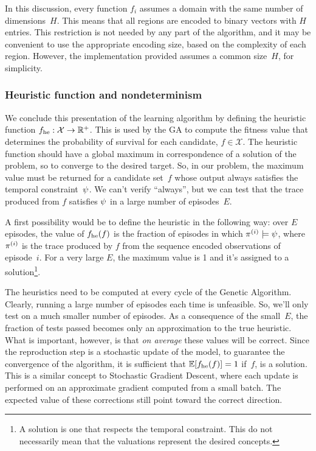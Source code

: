 In this discussion, every function $f_i$ assumes a domain with the same number
of dimensions~$H$. This means that all regions are encoded to binary vectors
with $H$ entries. This restriction is not needed by any part of the algorithm,
and it may be convenient to use the appropriate encoding size, based on the
complexity of each region. However, the implementation provided assumes a
common size~$H$, for simplicity.


\subsubsection{Heuristic function and nondeterminism}

We conclude this presentation of the learning algorithm by defining the
heuristic function $f_{\text{he}}: \mathcal{X} \to \mathbb{R}^+$. This is used by the
GA to compute the fitness value that determines the probability of survival
for each candidate, $f \in \mathcal{X}$. The heuristic function should have a
global maximum in correspondence of a solution of the problem, so to
converge to the desired target. So, in our problem, the maximum value must be
returned for a candidate set~$f$ whose output always satisfies the temporal
constraint~$\psi$. We can't verify ``always'', but we can test that
the trace produced from $f$ satisfies $\psi$ in a large number of
episodes~$E$.

A first possibility would be to define the heuristic in the following way:
over $E$ episodes, the value of $f_{\text{he}}(f)$ is the fraction of episodes
in which $\pi^{(i)} \models \psi$, where $\pi^{(i)}$ is
the trace produced by $f$ from the sequence encoded observations of
episode~$i$. For a very large $E$, the maximum value is 1 and it's assigned to
a solution\footnote{A solution is one that respects the temporal constraint.
This do not necessarily mean that the valuations represent the desired
concepts.}.

The heuristics need to be computed at every cycle of the Genetic Algorithm.
Clearly, running a large number of episodes each time is unfeasible. So, we'll
only test on a much smaller number of episodes. As a consequence of the
small~$E$, the fraction of tests passed becomes only an approximation to the
true heuristic.  What is important, however, is that \emph{on average} these
values will be correct. Since the reproduction step is a stochastic update of
the model, to guarantee the convergence of the algorithm, it is sufficient
that $\mathbb{E}[f_{\text{he}}(f)] = 1$ if~$f$, is a solution. This is a similar
concept to Stochastic Gradient Descent, where each update is performed on an
approximate gradient computed from a small batch. The expected value of these
corrections still point toward the correct direction.

